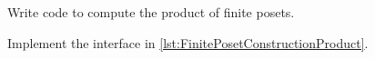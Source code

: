 
\begin{codeexercise}
    Write code to compute the product of finite posets.

    Implement the interface in \cref{lst:FinitePosetConstructionProduct}.
\end{codeexercise}




